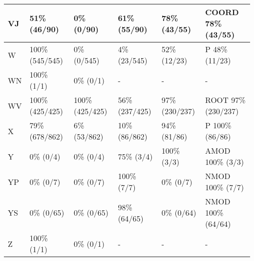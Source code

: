 \begin{small}
\begin{longtable}{|l|l|l|l|l|l|}
\hline
VJ & 51\% (46/90) & 0\% (0/90) & 61\% (55/90) & 78\% (43/55) & COORD 78\% (43/55) \\ 
\hline
W & 100\% (545/545) & 0\% (0/545) & 4\% (23/545) & 52\% (12/23) & P 48\% (11/23) \\ 
\hline
WN & 100\% (1/1) & 0\% (0/1) & - & - & - \\ 
\hline
WV & 100\% (425/425) & 100\% (425/425) & 56\% (237/425) & 97\% (230/237) & ROOT 97\% (230/237) \\ 
\hline
X & 79\% (678/862) & 6\% (53/862) & 10\% (86/862) & 94\% (81/86) & P 100\% (86/86) \\ 
\hline
Y & 0\% (0/4) & 0\% (0/4) & 75\% (3/4) & 100\% (3/3) & AMOD 100\% (3/3) \\ 
\hline
YP & 0\% (0/7) & 0\% (0/7) & 100\% (7/7) & 0\% (0/7) & NMOD 100\% (7/7) \\ 
\hline
YS & 0\% (0/65) & 0\% (0/65) & 98\% (64/65) & 0\% (0/64) & NMOD 100\% (64/64) \\ 
\hline
Z & 100\% (1/1) & 0\% (0/1) & - & - & - \\ 
\hline
\end{longtable}
\end{small}
